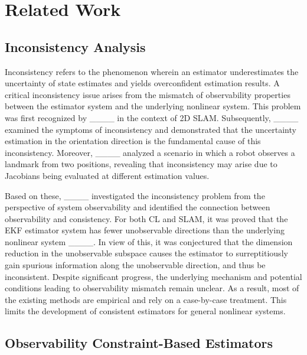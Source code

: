 \section{Related Work}
\label{sec:related_work}

\subsection{Inconsistency Analysis}

Inconsistency refers to the phenomenon wherein an estimator underestimates the uncertainty of state estimates and yields overconfident estimation results. A critical inconsistency issue arises from the mismatch of observability properties between the estimator system and the underlying nonlinear system. This problem was first recognized by ____ in the context of 2D SLAM. Subsequently, ____ examined the symptoms of inconsistency and demonstrated that the uncertainty estimation in the orientation direction is the fundamental cause of this inconsistency. Moreover, ____ analyzed a scenario in which a robot observes a landmark from two positions, revealing that inconsistency may arise due to Jacobians being evaluated at different estimation values.

Based on these, ____ investigated the inconsistency problem from the perspective of system observability and identified the connection between observability and consistency. For both CL and SLAM, it was proved that the EKF estimator system has fewer unobservable directions than the underlying nonlinear system ____. In view of this, it was conjectured that the dimension reduction in the unobservable subspace causes the estimator to surreptitiously gain spurious information along the unobservable direction, and thus be inconsistent. Despite significant progress, the underlying mechanism and potential conditions leading to observability mismatch remain unclear. As a result, most of the existing methods are empirical and rely on a case-by-case treatment. This limits the development of consistent estimators for general nonlinear systems.


\subsection{Observability Constraint-Based Estimators}

\def\txtq#1{{\color{red} #1}}

